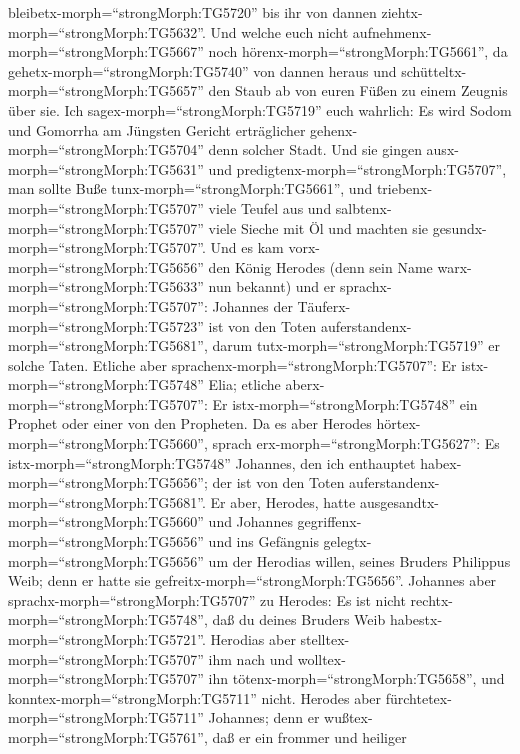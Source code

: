 bleibetx-morph=``strongMorph:TG5720'' bis ihr von dannen
ziehtx-morph=``strongMorph:TG5632''.  Und welche euch nicht
aufnehmenx-morph=``strongMorph:TG5667'' noch
hörenx-morph=``strongMorph:TG5661'', da
gehetx-morph=``strongMorph:TG5740'' von dannen heraus und
schütteltx-morph=``strongMorph:TG5657'' den Staub ab von euren Füßen zu
einem Zeugnis über sie. Ich sagex-morph=``strongMorph:TG5719'' euch
wahrlich: Es wird Sodom und Gomorrha am Jüngsten Gericht erträglicher
gehenx-morph=``strongMorph:TG5704'' denn solcher Stadt. 
Und sie gingen ausx-morph=``strongMorph:TG5631'' und
predigtenx-morph=``strongMorph:TG5707'', man sollte Buße
tunx-morph=``strongMorph:TG5661'',  und
triebenx-morph=``strongMorph:TG5707'' viele Teufel aus und
salbtenx-morph=``strongMorph:TG5707'' viele Sieche mit Öl und machten
sie gesundx-morph=``strongMorph:TG5707''.  Und es kam
vorx-morph=``strongMorph:TG5656'' den König Herodes (denn sein Name
warx-morph=``strongMorph:TG5633'' nun bekannt) und er
sprachx-morph=``strongMorph:TG5707'': Johannes der
Täuferx-morph=``strongMorph:TG5723'' ist von den Toten
auferstandenx-morph=``strongMorph:TG5681'', darum
tutx-morph=``strongMorph:TG5719'' er solche Taten.  Etliche
aber sprachenx-morph=``strongMorph:TG5707'': Er
istx-morph=``strongMorph:TG5748'' Elia; etliche
aberx-morph=``strongMorph:TG5707'': Er istx-morph=``strongMorph:TG5748''
ein Prophet oder einer von den Propheten.  Da es aber
Herodes hörtex-morph=``strongMorph:TG5660'', sprach
erx-morph=``strongMorph:TG5627'': Es istx-morph=``strongMorph:TG5748''
Johannes, den ich enthauptet habex-morph=``strongMorph:TG5656''; der ist
von den Toten auferstandenx-morph=``strongMorph:TG5681''. 
Er aber, Herodes, hatte ausgesandtx-morph=``strongMorph:TG5660'' und
Johannes gegriffenx-morph=``strongMorph:TG5656'' und ins Gefängnis
gelegtx-morph=``strongMorph:TG5656'' um der Herodias willen, seines
Bruders Philippus Weib; denn er hatte sie
gefreitx-morph=``strongMorph:TG5656''.  Johannes aber
sprachx-morph=``strongMorph:TG5707'' zu Herodes: Es ist nicht
rechtx-morph=``strongMorph:TG5748'', daß du deines Bruders Weib
habestx-morph=``strongMorph:TG5721''.  Herodias aber
stelltex-morph=``strongMorph:TG5707'' ihm nach und
wolltex-morph=``strongMorph:TG5707'' ihn
tötenx-morph=``strongMorph:TG5658'', und
konntex-morph=``strongMorph:TG5711'' nicht.  Herodes aber
fürchtetex-morph=``strongMorph:TG5711'' Johannes; denn er
wußtex-morph=``strongMorph:TG5761'', daß er ein frommer und heiliger
